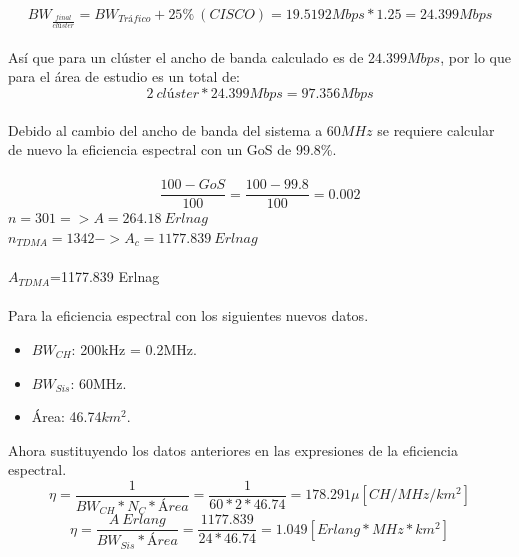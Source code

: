 \documentclass[11pt,letterpaper]{article}
\begin{document}
\begin{equation}
    BW_{\frac{final}{clúster}}=BW_{Tráfico}+25\% \ (CISCO)=19.5192Mbps*1.25=24.399Mbps
\end{equation}
\\ 
Así que para un clúster el ancho de banda calculado es de $24.399Mbps$, por lo que para el 
área de estudio es un total de:
\begin{equation}
    2 \ clúster * 24.399Mbps=97.356Mbps
\end{equation}
\\
Debido al cambio del ancho de banda del sistema a $60MHz$ se requiere calcular de nuevo la 
eficiencia espectral con un GoS de 99.8\%.
\\ \\
\begin{equation}
    \frac{100-GoS}{100}=\frac{100-99.8}{100}=0.002
\end{equation}
$n=301 => A=264.18 \ Erlnag$
\\ 
$n_{TDMA}=1342->A_c=1177.839 \ Erlnag$
\\ \\
$A_{TDMA}$=1177.839 Erlnag
\\ \\
Para la eficiencia espectral con los siguientes nuevos datos.
\begin{itemize}
    \item $BW_{CH}$: 200kHz = 0.2MHz.
    \item $BW_{Sis}$: 60MHz.
    \item Área: 46.74$km^2$.
\end{itemize}
Ahora sustituyendo los datos anteriores en las expresiones de la eficiencia espectral. 
\begin{equation}
    \eta=\frac{1}{BW_{CH}*N_C*Área}=\frac{1}{60*2*46.74}=178.291\mu[CH/MHz/km^2]
\end{equation}
\begin{equation}
    \eta=\frac{A \ Erlang}{BW_{Sis}*Área}=\frac{1177.839}{24*46.74}=1.049 [Erlang*MHz*km^2]
\end{equation}
\end{document}
